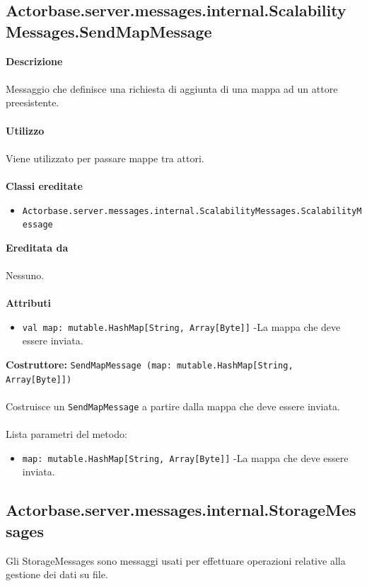 \documentclass[a4paper]{article}
\begin{document}
	\subsection{Actorbase.server.messages.internal.ScalabilityMessages.SendMapMessage}
		\textbf{Descrizione}
			\\ \\
			Messaggio che definisce una richiesta di aggiunta di una mappa ad un attore preesistente.
			\\ \\
		\textbf{Utilizzo}
			\\ \\
			Viene utilizzato per passare mappe tra attori.
			\\ \\
		\textbf{Classi ereditate}
			\begin{itemize}
				\item \texttt{Actorbase.server.messages.internal.ScalabilityMessages.ScalabilityMessage}
			\end{itemize}
		\textbf{Ereditata da}
			\\ \\
			Nessuno.
			\\ \\
		\textbf{Attributi}
			\begin{itemize}
				\item \texttt{val map: mutable.HashMap[String, Array[Byte]]} -La mappa che deve essere inviata.
			\end{itemize}
		\textbf{Costruttore:} \texttt{SendMapMessage (map: mutable.HashMap[String, Array[Byte]])}
		\\ \\
		Costruisce un \texttt{SendMapMessage} a partire dalla mappa che deve essere inviata.
		\\ \\
		Lista parametri del metodo:
			\begin{itemize}
				\item \texttt{map: mutable.HashMap[String, Array[Byte]]} -La mappa che deve essere inviata.
			\end{itemize}
			
	\subsection{Actorbase.server.messages.internal.StorageMessages}
		Gli StorageMessages sono messaggi usati per effettuare operazioni relative alla gestione dei dati su file.
		
\end{document}
